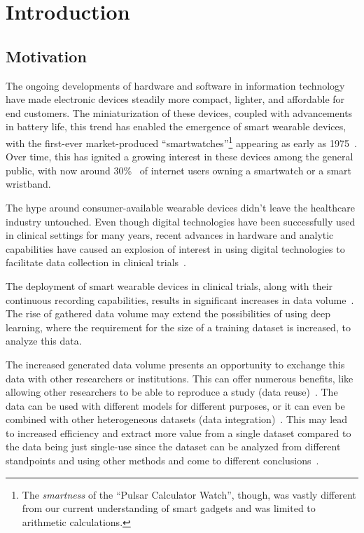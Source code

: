 \chapter{Introduction}\label{ch:introduction}

\section{Motivation}\label{sec:motivation}

The ongoing developments of hardware and software in information technology have made electronic devices steadily more compact, lighter, and affordable for end customers.
The miniaturization of these devices, coupled with advancements in battery life, this trend has enabled the emergence of smart wearable devices, with the first-ever market-produced ``smartwatches''\footnote{The \textit{smartness} of the ``Pulsar Calculator Watch'', though, was vastly different from our current understanding of smart gadgets and was limited to arithmetic calculations.} appearing as early as 1975~\cite{ometov_survey_2021}.
Over time, this has ignited a growing interest in these devices among the general public, with now around 30\%~\cite{simon_kemp_rise_2023} of internet users owning a smartwatch or a smart wristband.

The hype around consumer-available wearable devices didn't leave the healthcare industry untouched.
Even though digital technologies have been successfully used in clinical settings for many years, recent advances in hardware and analytic capabilities have caused an explosion of interest in using digital technologies to facilitate data collection in clinical trials~\cite{clay_impact_2017}.

The deployment of smart wearable devices in clinical trials, along with their continuous recording capabilities, results in significant increases in data volume~\cite{munos_mobile_2016}.
The rise of gathered data volume may extend the possibilities of using deep learning, where the requirement for the size of a training dataset is increased, to analyze this data.

The increased generated data volume presents an opportunity to exchange this data with other researchers or institutions.
This can offer numerous benefits, like allowing other researchers to be able to reproduce a study (data reuse)~\cite{pasquetto_reuse_2017}.
The data can be used with different models for different purposes, or it can even be combined with other heterogeneous datasets (data integration)~\cite{pasquetto_reuse_2017}.
This may lead to increased efficiency and extract more value from a single dataset compared to the data being just single-use since the dataset can be analyzed from different standpoints and using other methods and come to different conclusions~\cite{pasquetto_reuse_2017}.

